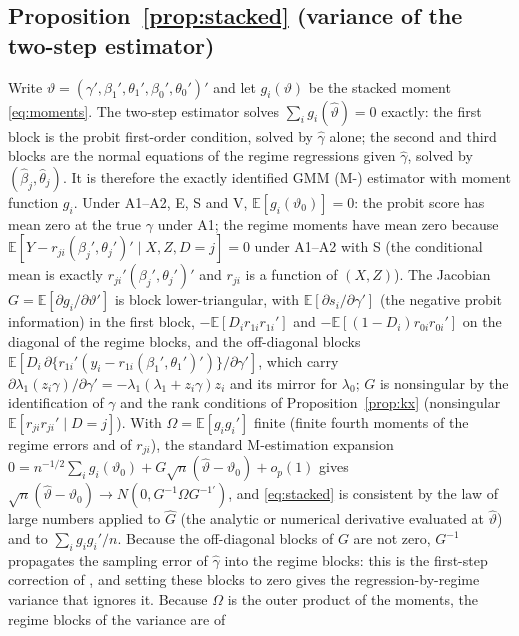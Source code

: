 \documentclass[11pt,a4paper]{article}
\theoremstyle{plain}
\theoremstyle{definition}
\theoremstyle{remark}
\newcommand{\E}{\mathbb{E}}
\newcommand{\1}{\mathbf{1}}
\begin{document}
\subsection{Proposition~\ref{prop:stacked} (variance of the two-step estimator)}

Write $\vartheta=(\gamma',\beta_1',\theta_1',\beta_0',\theta_0')'$ and let
$g_i(\vartheta)$ be the stacked moment \eqref{eq:moments}. The two-step
estimator solves $\sum_ig_i(\hat\vartheta)=0$ exactly: the first block is
the probit first-order condition, solved by $\hat\gamma$ alone; the
second and third blocks are the normal equations of the regime
regressions given $\hat\gamma$, solved by
$(\hat\beta_j,\hat\theta_j)$. It is therefore the exactly identified
GMM (M-) estimator with moment function $g_i$. Under A1--A2, E, S and V,
$\E[g_i(\vartheta_0)]=0$: the probit score has mean zero at the true
$\gamma$ under A1; the regime moments have mean zero because
$\E[Y-r_{ji}(\beta_j',\theta_j')'\mid X,Z,D=j]=0$ under A1--A2 with S
(the conditional mean is exactly $r_{ji}'(\beta_j',\theta_j')'$ and $r_{ji}$
is a function of $(X,Z)$). The Jacobian $G=\E[\partial g_i/\partial\vartheta']$
is block lower-triangular, with $\E[\partial s_i/\partial\gamma']$ (the
negative probit information) in the first block, $-\E[D_ir_{1i}r_{1i}']$
and $-\E[(1-D_i)r_{0i}r_{0i}']$ on the diagonal of the regime blocks,
and the off-diagonal blocks
$\E[D_i\,\partial\{r_{1i}'(y_i-r_{1i}(\beta_1',\theta_1')')\}/\partial\gamma']$,
which carry $\partial\lambda_1(z_i\gamma)/\partial\gamma'=-\lambda_1(\lambda_1+z_i\gamma)z_i$
and its mirror for $\lambda_0$; $G$ is nonsingular by the identification
of $\gamma$ and the rank conditions of Proposition~\ref{prop:kx}
(nonsingular $\E[r_{ji}r_{ji}'\mid D=j]$). With $\Omega=\E[g_ig_i']$
finite (finite fourth moments of the regime errors and of $r_{ji}$),
the standard M-estimation expansion
$0=n^{-1/2}\sum_ig_i(\vartheta_0)+G\sqrt n(\hat\vartheta-\vartheta_0)+o_p(1)$
\citep[Theorem~12.3]{wooldridge2010} gives
$\sqrt n(\hat\vartheta-\vartheta_0)\to N(0,G^{-1}\Omega G^{-1\prime})$,
and \eqref{eq:stacked} is consistent by the law of large numbers applied
to $\hat G$ (the analytic or numerical derivative evaluated at
$\hat\vartheta$) and to $\sum_ig_ig_i'/n$. Because the off-diagonal blocks
of $G$ are not zero, $G^{-1}$ propagates the sampling error of
$\hat\gamma$ into the regime blocks: this is the first-step correction of
\citet{newey1984}, and setting these blocks to zero gives the
regression-by-regime variance that ignores it. Because $\Omega$ is the
outer product of the moments, the regime blocks of the variance are of
\end{document}
